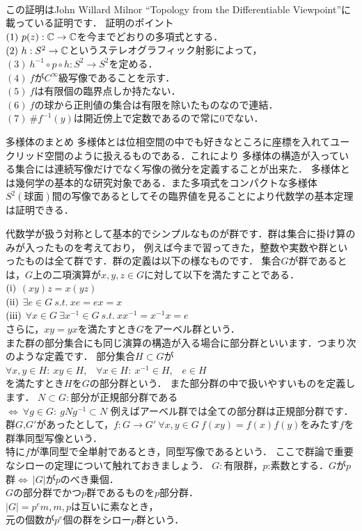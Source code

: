 \proof[多様体論を用いた代数学の基本定理の証明]
\leavevmode\\
この証明はJohn Willard Milnor ``Topology from the Differentiable Viewpoint''に載っている証明です．
証明のポイント\\
$(1)\ p(z):\C\to\C$を今までどおりの多項式とする．\\
$(2)\ h:S^2\to\C$というステレオグラフィック射影によって，\\
$(3)\ h^{-1}\circ p \circ h : S^2 \to S^2$を定める．\\
$(4)\ f$が$C^\infty$級写像であることを示す．\\
$(5)\ f$は有限個の臨界点しか持たない．\\
$(6)\ f$の球から正則値の集合は有限を除いたものなので連結．\\
$(7)\ \# f^{-1}(y)$は開近傍上で定数であるので常に0でない．\\
\proofx
\begin{itembox}[l]{多様体のまとめ}
多様体とは位相空間の中でも好きなところに座標を入れてユークリッド空間のように扱えるものである．これにより
多様体の構造が入っている集合には連続写像だけでなく写像の微分を定義することが出来た．
多様体とは幾何学の基本的な研究対象である．また多項式をコンパクトな多様体$S^2(球面)$間の写像であるとしてその臨界値を見ることにより代数学の基本定理は証明できる．

\end{itembox}
代数学が扱う対称として基本的でシンプルなものが群です．群は集合に掛け算のみが入ったものを考えており，
例えば今まで習ってきた，整数や実数や群といったものは全て群です．群の定義は以下の様なものです．
集合$G$が群であるとは，$G$上の二項演算が$x,y,z\in G$に対して以下を満たすことである．\\
$\rm (i)$ $(xy)z=x(yz)$\\
$\rm (ii)$ $\exists e \in  G \ s.t. \ xe=ex=x$\\
$\rm (iii)$ $\forall x\in G \ \exists x^{-1} \in G \ s.t. \ x x^{-1} = x^{-1} x= e$\\
さらに，$xy=yx$を満たすとき$G$をアーベル群という．\\
また群の部分集合にも同じ演算の構造が入る場合に部分群といいます．つまり次のような定義です．
部分集合$H\subset G$が\\
$\forall x,y \in H: \ xy\in H$,\ \ $\forall x\in H:\ x^{-1} \in H$,\ \ $e\in H$\\
を満たすとき$H$を$G$の部分群という．
また部分群の中で扱いやすいものを定義します．
$N\subset G:$部分が正規部分群である\\
$\iff \ \forall g\in G : \ gNg^{-1} \subset N$
例えばアーベル群では全ての部分群は正規部分群です．
群$G$,$G'$があったとして，$f:G\to G' \  \forall x,y \in G \ f(xy)=f(x)f(y)$をみたす$f$を群準同型写像という．\\
特に$f$が準同型で全単射であるとき，同型写像であるという．
ここで群論で重要なシローの定理について触れておきましょう．
$G:$有限群，$p$:素数とする．$G$が$p$群$\iff\ |G|$が$p$のべき乗個．\\
$G$の部分群でかつ$p$群であるものを$p$部分群．\\
$|G|=p^e m, m,p$は互いに素なとき，\\
元の個数が$p^e$個の群をシロー$p$群という．

